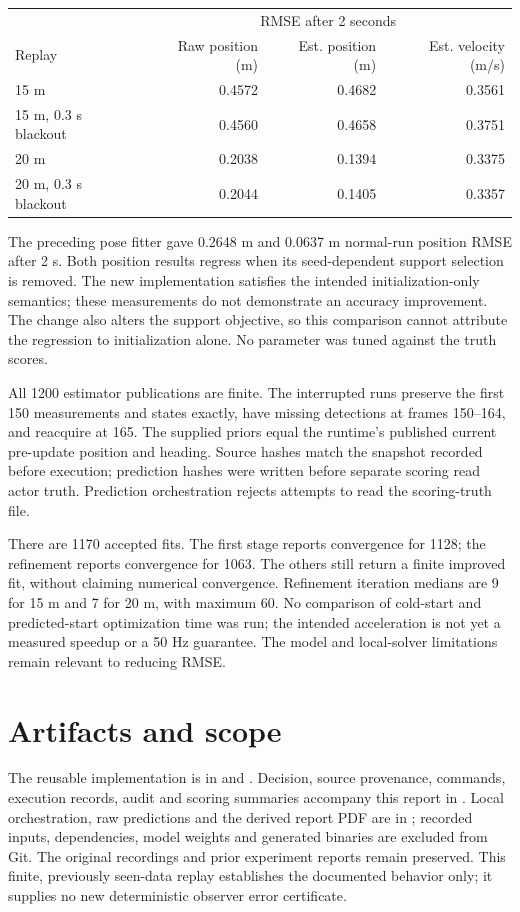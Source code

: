 \documentclass[11pt]{article}
\begin{document}
\begin{center}\small
\begin{tabular}{@{}lrrr@{}}\toprule
 & \multicolumn{3}{c}{RMSE after 2 seconds} \\
Replay & Raw position (m) & Est. position (m) & Est. velocity (m/s) \\\midrule
15 m & 0.4572 & 0.4682 & 0.3561 \\
15 m, 0.3 s blackout & 0.4560 & 0.4658 & 0.3751 \\
20 m & 0.2038 & 0.1394 & 0.3375 \\
20 m, 0.3 s blackout & 0.2044 & 0.1405 & 0.3357 \\
\bottomrule\end{tabular}
\end{center}

The preceding pose fitter gave 0.2648 m and 0.0637 m normal-run position
RMSE after 2 s. Both position results regress when its seed-dependent
support selection is removed. The new implementation satisfies the intended
initialization-only semantics; these measurements do not demonstrate an
accuracy improvement. The change also alters the support objective, so this
comparison cannot attribute the regression to initialization alone.
No parameter was tuned against the truth scores.

All 1200 estimator publications are finite. The interrupted runs preserve
the first 150 measurements and states exactly, have missing detections at
frames 150--164, and reacquire at 165. The supplied priors equal the runtime's
published current pre-update position and heading. Source hashes match the
snapshot recorded before execution; prediction hashes were written before
separate scoring read actor truth. Prediction orchestration rejects attempts
to read the scoring-truth file.

There are 1170 accepted fits. The first stage reports convergence for 1128;
the refinement reports convergence for 1063. The others still return a
finite improved fit, without claiming numerical convergence. Refinement
iteration medians are 9 for 15 m and 7 for 20 m, with maximum 60.
No comparison of cold-start and predicted-start optimization time was run;
the intended acceleration is not yet a measured speedup or a 50 Hz guarantee.
The model and local-solver limitations remain relevant to reducing RMSE.

\section{Artifacts and scope}
The reusable implementation is in
 and
. Decision, source provenance,
commands, execution records, audit and scoring summaries accompany this
report in .
Local orchestration, raw predictions and the derived report PDF are in
; recorded inputs,
dependencies, model weights and generated binaries are excluded from Git.
The original recordings and prior experiment reports remain preserved.
This finite, previously seen-data replay establishes the documented behavior
only; it supplies no new deterministic observer error certificate.
\end{document}
